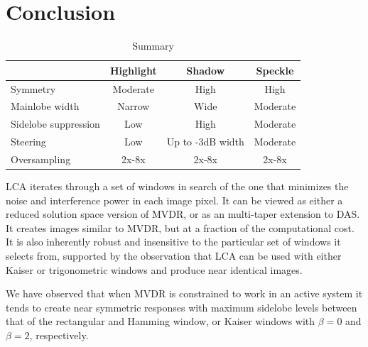 \documentclass[10pt,journal,draftclsnofoot,onecolumn]{IEEEtran}
\let\MYoriglatexcaption\caption               %
\renewcommand{\caption}[2][\relax]{\MYoriglatexcaption[#2]{#2}}
\newcommand\Fig[1]{Fig.~\ref{#1}}
\newcommand\1{\vec 1}
\begin{document}
% 
% 


\section{Conclusion}\label{sec:conclusion}

\begin{table}[!b]\centering%
\begin{tabular}[c]{l c c c}\hline
\rowcolor{tabBlue} & \bf Highlight & \bf Shadow & \bf Speckle  \\\hline
Symmetry             & Moderate  & High   & High \\
Mainlobe width       & Narrow    & Wide   & Moderate \\
Sidelobe suppression & Low       & High   & Moderate \\
Steering             & Low       & Up to -3dB width & Moderate \\
Oversampling         & 2x-8x     & 2x-8x  & 2x-8x
\end{tabular}
\caption{Summary}\label{tab:summary}
\end{table}%

LCA iterates through a set of windows in search of the one that minimizes the noise and interference power in each image pixel. It can be viewed as either a reduced solution space version of MVDR, or as an multi-taper extension to DAS. It creates images similar to MVDR, but at a fraction of the computational cost. It is also inherently robust and insensitive to the particular set of windows it selects from, supported by the observation that LCA can be used with either Kaiser or trigonometric windows and produce near identical images.

We have observed that when MVDR is constrained to work in an active system it tends to create near symmetric responses with maximum sidelobe levels between that of the rectangular and Hamming window, or Kaiser windows with $\beta=0$ and $\beta=2$, respectively. 
\end{document}
